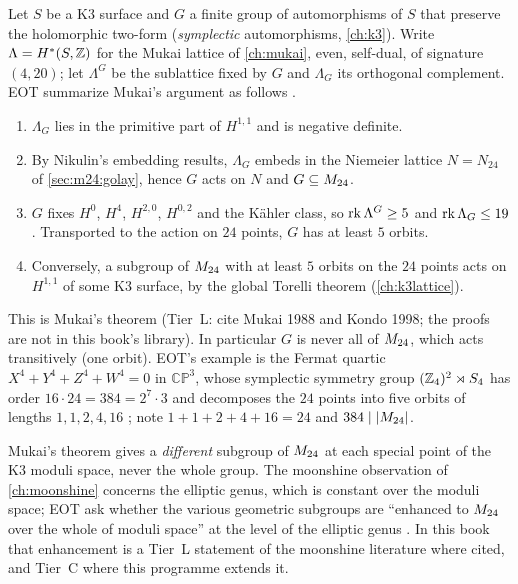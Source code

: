 Let $S$ be a K3 surface and $G$ a finite group of automorphisms of $S$ that preserve the
holomorphic two-form (\emph{symplectic} automorphisms, \cref{ch:k3}). Write
$\Lambda=H^*(S,\mathbb{Z})$ for the Mukai lattice of \cref{ch:mukai}, even, self-dual, of signature
$(4,20)$; let $\Lambda^G$ be the sublattice fixed by $G$ and $\Lambda_G$ its orthogonal
complement. EOT summarize Mukai's argument as follows .
\begin{enumerate}[leftmargin=*,itemsep=2pt]
\item $\Lambda_G$ lies in the primitive part of $H^{1,1}$ and is negative definite.
\item By Nikulin's embedding results, $\Lambda_G$ embeds in the Niemeier lattice
 $N=N_{24}$ of \cref{sec:m24:golay}, hence $G$ acts on $N$ and $G\subseteq M_{24}$.
\item $G$ fixes $H^0$, $H^4$, $H^{2,0}$, $H^{0,2}$ and the K\"ahler class, so
 $\operatorname{rk}\Lambda^G\ge5$ and $\operatorname{rk}\Lambda_G\le19$. Transported to the action on $24$ points, $G$
 has at least $5$ orbits.
\item Conversely, a subgroup of $M_{24}$ with at least $5$ orbits on the $24$ points acts on
 $H^{1,1}$ of some K3 surface, by the global Torelli theorem (\cref{ch:k3lattice}).
\end{enumerate}
This is Mukai's theorem (Tier~L:  cite Mukai 1988 and Kondo 1998; the proofs are not in this book's library).
In particular $G$ is never all of $M_{24}$, which acts transitively (one orbit). EOT's example
is the Fermat quartic $X^4+Y^4+Z^4+W^4=0$ in $\mathbb{CP}^3$, whose symplectic symmetry group
$(\mathbb{Z}_4)^2\rtimes S_4$ has order $16\cdot24=384=2^7\cdot3$ and decomposes the $24$ points into
five orbits of lengths $1,1,2,4,16$ ; note $1+1+2+4+16=24$
and $384\mid|M_{24}|$.

\begin{physicsbox}
Mukai's theorem gives a \emph{different} subgroup of $M_{24}$ at each special point of the K3
moduli space, never the whole group. The moonshine observation of \cref{ch:moonshine}
concerns the elliptic genus, which is constant over the moduli space; EOT ask whether the
various geometric subgroups are ``enhanced to $M_{24}$ over the whole of moduli space'' at the
level of the elliptic genus . In this book that enhancement is
a Tier~L statement of the moonshine literature where cited, and Tier~C where this
programme extends it.
\end{physicsbox}

